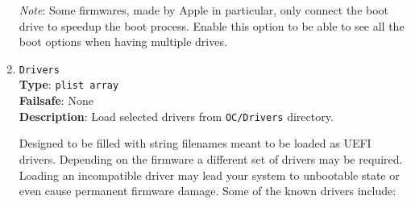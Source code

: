 \documentclass[]{article}
\begin{document}
\begin{enumerate}
  \emph{Note}: Some firmwares, made by Apple in particular, only connect the boot
  drive to speedup the boot process. Enable this option to be able to see all the
  boot options when having multiple drives.

\item
  \texttt{Drivers}\\
  \textbf{Type}: \texttt{plist\ array}\\
  \textbf{Failsafe}: None\\
  \textbf{Description}: Load selected drivers from \texttt{OC/Drivers}
  directory.

  Designed to be filled with string filenames meant to be loaded as UEFI
  drivers. Depending on the firmware a different set of drivers may be required.
  Loading an incompatible driver may lead your system to unbootable state or
  even cause permanent firmware damage. Some of the known drivers include:


\end{enumerate}
\end{document}
